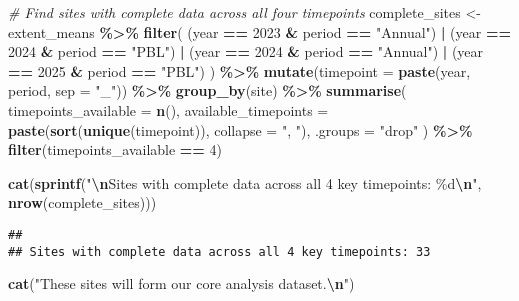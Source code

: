 \documentclass[
]{article}
\newenvironment{Shaded}{\begin{snugshade}}{\end{snugshade}}
\newcommand{\AttributeTok}[1]{\textcolor[rgb]{0.13,0.29,0.53}{#1}}
\newcommand{\CommentTok}[1]{\textcolor[rgb]{0.56,0.35,0.01}{\textit{#1}}}
\newcommand{\DecValTok}[1]{\textcolor[rgb]{0.00,0.00,0.81}{#1}}
\newcommand{\FunctionTok}[1]{\textcolor[rgb]{0.13,0.29,0.53}{\textbf{#1}}}
\newcommand{\NormalTok}[1]{#1}
\newcommand{\OtherTok}[1]{\textcolor[rgb]{0.56,0.35,0.01}{#1}}
\newcommand{\SpecialCharTok}[1]{\textcolor[rgb]{0.81,0.36,0.00}{\textbf{#1}}}
\newcommand{\StringTok}[1]{\textcolor[rgb]{0.31,0.60,0.02}{#1}}
\begin{document}
\begin{Shaded}
\begin{Highlighting}[]
\CommentTok{\# Find sites with complete data across all four timepoints}
\NormalTok{complete\_sites }\OtherTok{\textless{}{-}}\NormalTok{ extent\_means }\SpecialCharTok{\%\textgreater{}\%}
  \FunctionTok{filter}\NormalTok{(}
\NormalTok{    (year }\SpecialCharTok{==} \DecValTok{2023} \SpecialCharTok{\&}\NormalTok{ period }\SpecialCharTok{==} \StringTok{"Annual"}\NormalTok{) }\SpecialCharTok{|}
\NormalTok{      (year }\SpecialCharTok{==} \DecValTok{2024} \SpecialCharTok{\&}\NormalTok{ period }\SpecialCharTok{==} \StringTok{"PBL"}\NormalTok{) }\SpecialCharTok{|}
\NormalTok{      (year }\SpecialCharTok{==} \DecValTok{2024} \SpecialCharTok{\&}\NormalTok{ period }\SpecialCharTok{==} \StringTok{"Annual"}\NormalTok{) }\SpecialCharTok{|}
\NormalTok{      (year }\SpecialCharTok{==} \DecValTok{2025} \SpecialCharTok{\&}\NormalTok{ period }\SpecialCharTok{==} \StringTok{"PBL"}\NormalTok{)}
\NormalTok{  ) }\SpecialCharTok{\%\textgreater{}\%}
  \FunctionTok{mutate}\NormalTok{(}\AttributeTok{timepoint =} \FunctionTok{paste}\NormalTok{(year, period, }\AttributeTok{sep =} \StringTok{"\_"}\NormalTok{)) }\SpecialCharTok{\%\textgreater{}\%}
  \FunctionTok{group\_by}\NormalTok{(site) }\SpecialCharTok{\%\textgreater{}\%}
  \FunctionTok{summarise}\NormalTok{(}
    \AttributeTok{timepoints\_available =} \FunctionTok{n}\NormalTok{(),}
    \AttributeTok{available\_timepoints =} \FunctionTok{paste}\NormalTok{(}\FunctionTok{sort}\NormalTok{(}\FunctionTok{unique}\NormalTok{(timepoint)), }\AttributeTok{collapse =} \StringTok{", "}\NormalTok{),}
    \AttributeTok{.groups =} \StringTok{"drop"}
\NormalTok{  ) }\SpecialCharTok{\%\textgreater{}\%}
  \FunctionTok{filter}\NormalTok{(timepoints\_available }\SpecialCharTok{==} \DecValTok{4}\NormalTok{)}

\FunctionTok{cat}\NormalTok{(}\FunctionTok{sprintf}\NormalTok{(}\StringTok{"}\SpecialCharTok{\textbackslash{}n}\StringTok{Sites with complete data across all 4 key timepoints: \%d}\SpecialCharTok{\textbackslash{}n}\StringTok{"}\NormalTok{, }\FunctionTok{nrow}\NormalTok{(complete\_sites)))}
\end{Highlighting}
\end{Shaded}

\begin{verbatim}
## 
## Sites with complete data across all 4 key timepoints: 33
\end{verbatim}

\begin{Shaded}
\begin{Highlighting}[]
\FunctionTok{cat}\NormalTok{(}\StringTok{"These sites will form our core analysis dataset.}\SpecialCharTok{\textbackslash{}n}\StringTok{"}\NormalTok{)}
\end{Highlighting}
\end{Shaded}
\end{document}
